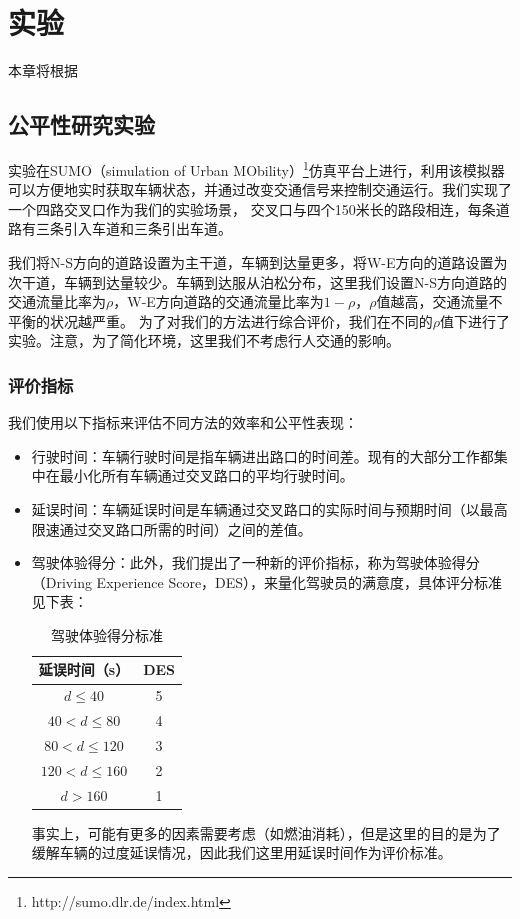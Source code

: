 \chapter{实验}
本章将根据

\section{公平性研究实验}
实验在SUMO（simulation of Urban MObility）\footnote{http://sumo.dlr.de/index.html}仿真平台上进行，利用该模拟器可以方便地实时获取车辆状态，并通过改变交通信号来控制交通运行。我们实现了一个四路交叉口作为我们的实验场景，
交叉口与四个150米长的路段相连，每条道路有三条引入车道和三条引出车道。

我们将N-S方向的道路设置为主干道，车辆到达量更多，将W-E方向的道路设置为次干道，车辆到达量较少。车辆到达服从泊松分布，这里我们设置N-S方向道路的交通流量比率为$\rho$，W-E方向道路的交通流量比率为$1-\rho$，$\rho$值越高，交通流量不平衡的状况越严重。
为了对我们的方法进行综合评价，我们在不同的$\rho$值下进行了实验。注意，为了简化环境，这里我们不考虑行人交通的影响。

\subsection{评价指标}
我们使用以下指标来评估不同方法的效率和公平性表现：
\begin{itemize}
    \item 行驶时间：车辆行驶时间是指车辆进出路口的时间差。现有的大部分工作都集中在最小化所有车辆通过交叉路口的平均行驶时间。
    \item 延误时间：车辆延误时间是车辆通过交叉路口的实际时间与预期时间（以最高限速通过交叉路口所需的时间）之间的差值。
    \item 驾驶体验得分：此外，我们提出了一种新的评价指标，称为驾驶体验得分（Driving Experience Score，DES），来量化驾驶员的满意度，具体评分标准见下表：
        \begin{table}[htb]
            \caption{驾驶体验得分标准}
            \begin{tabular}{cc}
            \toprule
            延误时间（s） & DES \\
            \midrule
            $d \leq 40$ & 5\\
            $40 < d \leq 80$ & 4 \\
            $80 < d \leq 120$ & 3 \\
            $120 < d \leq 160$ & 2 \\
            $d > 160$ & 1 \\ 
            \bottomrule
            \end{tabular}
        \end{table}
        事实上，可能有更多的因素需要考虑（如燃油消耗），但是这里的目的是为了缓解车辆的过度延误情况，因此我们这里用延误时间作为评价标准。
\end{itemize}
